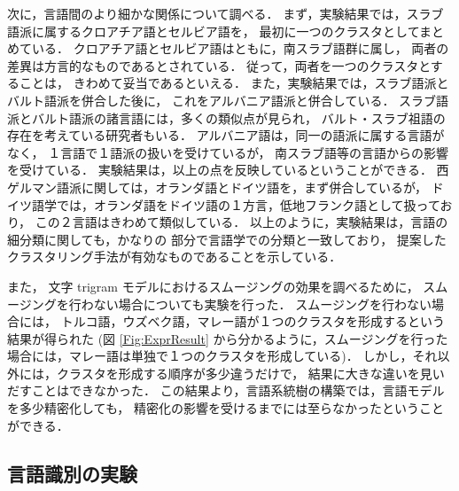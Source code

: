 \clearpage

次に，言語間のより細かな関係について調べる．
まず，実験結果では，スラブ語派に属するクロアチア語とセルビア語を，
最初に一つのクラスタとしてまとめている．
クロアチア語とセルビア語はともに，南スラブ語群に属し，
両者の差異は方言的なものであるとされている．
従って，両者を一つのクラスタとすることは，
きわめて妥当であるといえる．
また，実験結果では，スラブ語派とバルト語派を併合した後に，
これをアルバニア語派と併合している．
スラブ語派とバルト語派の諸言語には，多くの類似点が見られ，
バルト・スラブ祖語の存在を考えている研究者もいる．
アルバニア語は，同一の語派に属する言語がなく，
１言語で１語派の扱いを受けているが，
南スラブ語等の言語からの影響を受けている．
実験結果は，以上の点を反映しているということができる．
西ゲルマン語派に関しては，オランダ語とドイツ語を，まず併合しているが，
ドイツ語学では，オランダ語をドイツ語の１方言，低地フランク語として扱っており，
この２言語はきわめて類似している．
以上のように，実験結果は，言語の細分類に関しても，かなりの
部分で言語学での分類と一致しており，
提案したクラスタリング手法が有効なものであることを示している．

また，
文字 trigram モデルにおけるスムージングの効果を調べるために，
スムージングを行わない場合についても実験を行った．
スムージングを行わない場合には，
トルコ語，ウズベク語，マレー語が１つのクラスタを形成するという
結果が得られた
(図 \ref{Fig:ExprResult} から分かるように，スムージングを行った
場合には，マレー語は単独で１つのクラスタを形成している)．
しかし，それ以外には，クラスタを形成する順序が多少違うだけで，
結果に大きな違いを見いだすことはできなかった．
この結果より，言語系統樹の構築では，言語モデルを多少精密化しても，
精密化の影響を受けるまでには至らなかったということができる．


\subsection{言語識別の実験}


